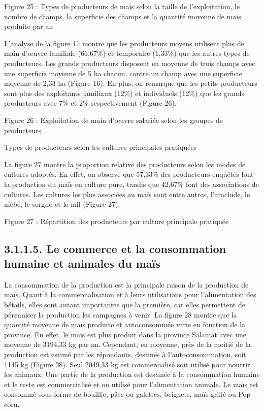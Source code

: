 \documentclass[12pt,oneside]{report}
\begin{document}
Figure 25 : Types de producteurs de maïs selon la taille de l’exploitation, le nombre de champs, la superficie des champs et la quantité moyenne de maïs produite par an

L’analyse de la figure 17 montre que les producteurs moyens utilisent plus de main d’œuvre familiale (66,67\%) et temporaire (1,33\%) que les autres types de producteurs. Les grands producteurs disposent en moyenne de trois champs avec une superficie moyenne de 5 ha chacun, contre un champ avec une superficie moyenne de 2,33 ha (Figure 16). En plus, on remarque que les petits producteurs sont plus des exploitants familiaux (12\%) et individuels (12\%) que les grands producteurs avec 7\% et 2\% respectivement (Figure 26).

Figure 26 : Exploitation de main d’œuvre salariée selon les groupes de producteurs

Types de producteurs selon les cultures principales pratiquées

La figure 27 montre la proportion relative des producteurs selon les modes de cultures adoptés. En effet, on observe que 57,33\% des producteurs enquêtés font la production du maïs en culture pure, tandis que 42,67\% font des associations de cultures. Les cultures les plus associées au maïs sont entre autres, l’arachide, le niébé, le sorgho et le mil (Figure 27).

Figure 27 : Répartition des producteurs par culture principale pratiquée

\subsection{3.1.1.5. Le commerce et la consommation humaine et animales du maïs}
La consommation de la production est la principale raison de la production de maïs. Quant à la commercialisation et à leurs utilisations pour l’alimentation des bétails, elles sont autant importantes que la première, car elles permettent de pérenniser la production les campagnes à venir.  La figure 28 montre que la quantité moyenne de maïs produite et autoconsommée varie en fonction de la province. En effet, le maïs est plus produit dans la province Salamat avec une moyenne de 3194,33 kg par an. Cependant, en moyenne, près de la moitié de la production est estimé par les répondants, destinés à l’autoconsommation, soit 1145 kg (Figure 28). Seul 2049,33 kg est commercialisé soit utilisé pour nourrir les animaux. Une partie de la production est destinée à la consommation humaine et le reste est commercialisé et ou utilisé pour l’alimentation animale. Le maïs est consommé sous forme de bouillie, pâte ou galettes, beignets, maïs grillé ou Pop-corn.
\end{document}
